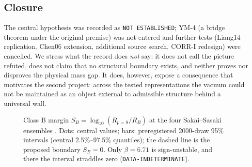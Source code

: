 \documentclass[11pt,a4paper]{article}
\theoremstyle{definition}
\theoremstyle{remark}
\begin{document}
\subsection{Closure}
The central hypothesis was recorded as \texttt{NOT ESTABLISHED}; YM-4 (a bridge theorem under the original premise) was not entered and further tests (Liang14 replication, Chen06 extension, additional source search, CORR-I redesign) were cancelled. We stress what the record does \emph{not} say: it does not call the picture refuted, does not claim that no structural boundary exists, and neither proves nor disproves the physical mass gap. It does, however, expose a consequence that motivates the second project: across the tested representations the vacuum could not be maintained as an object external to admissible structure behind a universal wall.

\begin{figure}[t]
\centering
{}
\caption{Class B margin $S_B=\log_{10}(R_{p=8}/R_B)$ at the four Sakai--Sasaki ensembles \cite{SS23}. Dots: central values; bars: preregistered 2000-draw 95\% intervals (central 2.5\%--97.5\% quantiles); the dashed line is the proposed boundary $S_B=0$. Only $\beta=6.71$ is sign-unstable, and there the interval straddles zero (\texttt{DATA-\allowbreak{}INDETERMINATE}).}\label{fig:SB}
\end{figure}
\end{document}
